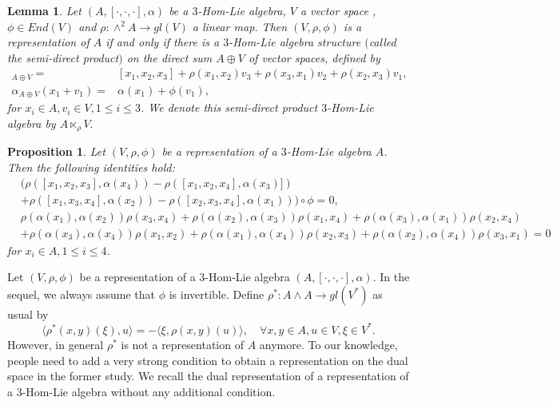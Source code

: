 \documentclass[a4paper,11pt]{article}
\def\a{\alpha}
\newtheorem{lem}[thm]{Lemma}
\newtheorem{pro}[thm]{Proposition}
\theoremstyle{definition}
\begin{document}
\begin{lem}
Let $(A,[\cdot,\cdot,\cdot],\alpha)$ be a $3$-Hom-Lie algebra, $V$  a vector space , $\phi\in End(V)$ and $\rho:
\wedge^2A\rightarrow  gl(V)$  a  linear
map. Then $(V,\rho,\phi)$ is a representation of $A$ if and only if there
is a $3$-Hom-Lie algebra structure $($called the semi-direct product$)$
on the direct sum $A\oplus V$ of vector spaces, defined by
\begin{align}
[x_1+v_1,x_2+v_2,x_3+v_3]_{A\oplus V}=&[x_1,x_2,x_3]+\rho(x_1,x_2)v_3+\rho(x_3,x_1)v_2+\rho(x_2,x_3)v_1, \\
\alpha_{A\oplus V}(x_1+v_1)=&\alpha(x_1)+\phi(v_1),
\end{align}
for $x_i\in A, v_i\in V, 1\leq i\leq 3$. We denote this semi-direct product  $3$-Hom-Lie algebra by $A\ltimes_\rho V.$
\end{lem}

\begin{pro}\label{pro:rep properties}
Let $(V,\rho,\phi)$ be a representation of a $3$-Hom-Lie algebra $A$. Then the following identities hold:
{\small\begin{align}\label{pro:new-repn}
&(\rho([x_1,x_2,x_3],\alpha(x_4))-\rho([x_1,x_2,x_4],\alpha(x_3)])\nonumber\\&+\rho([x_1,x_3,x_4],\alpha(x_2))
    -\rho([x_2,x_3,x_4],\alpha(x_1)))\circ\phi=0,\\
&\rho(\alpha(x_1),\alpha(x_2))\rho(x_3,x_4)+\rho(\alpha(x_2),\alpha(x_3))\rho(x_1,x_4)+\rho(\alpha(x_3),\alpha(x_1))\rho(x_2,x_4)
\nonumber\\& +\rho(\alpha(x_3),\alpha(x_4))\rho(x_1,x_2)+\rho(\alpha(x_1),\alpha(x_4))\rho(x_2,x_3)+\rho(\alpha(x_2),\alpha(x_4))\rho(x_3,x_1)=0
\end{align}}
for $x_i\in A, 1\leq i\leq 4$.
\end{pro}


Let $(V,\rho,\phi)$ be a representation of a $3$-Hom-Lie algebra $(A,[\cdot,\cdot,\cdot],\a)$. In the sequel, we always assume that $\phi$ is invertible. Define $\rho^*: A\wedge A \longrightarrow gl(V^*)$ as usual by
$$\langle \rho^*(x,y)(\xi),u\rangle=-\langle\xi,\rho(x,y)(u)\rangle,\quad\forall x,y\in A,u\in V,\xi\in V^*.$$
However, in general $\rho^*$ is not a representation of $A$ anymore. To our knowledge, people need to add a very strong condition to obtain a representation on the dual space in the former study.  We recall the dual representation of a representation of a $3$-Hom-Lie algebra without any additional condition.
\end{document}
